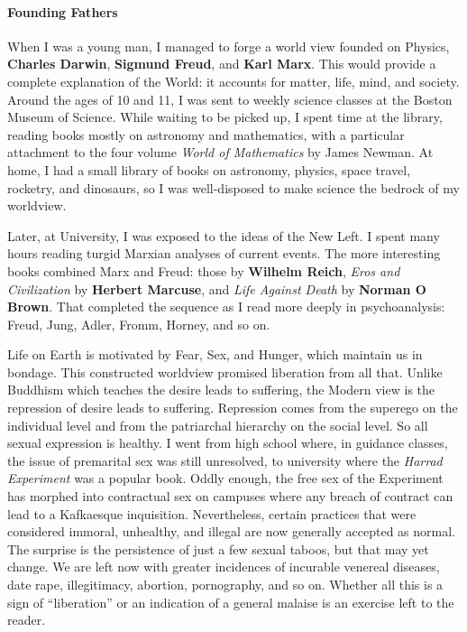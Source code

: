 \paragraph{Founding Fathers}


When I was a young man, I managed to forge a world view founded on Physics, \textbf{Charles Darwin}, \textbf{Sigmund Freud}, and \textbf{Karl Marx}. This would provide a complete explanation of the World: it accounts for matter, life, mind, and society. Around the ages of 10 and 11, I was sent to weekly science classes at the Boston Museum of Science. While waiting to be picked up, I spent time at the library, reading books mostly on astronomy and mathematics, with a particular attachment to the four volume \emph{World of Mathematics} by James Newman. At home, I had a small library of books on astronomy, physics, space travel, rocketry, and dinosaurs, so I was well-disposed to make science the bedrock of my worldview.

Later, at University, I was exposed to the ideas of the New Left. I spent many hours reading turgid Marxian analyses of current events. The more interesting books combined Marx and Freud: those by \textbf{Wilhelm Reich}, \emph{Eros and Civilization} by \textbf{Herbert Marcuse}, and \emph{Life Against Death} by \textbf{Norman O Brown}. That completed the sequence as I read more deeply in psychoanalysis: Freud, Jung, Adler, Fromm, Horney, and so on.

Life on Earth is motivated by Fear, Sex, and Hunger, which maintain us in bondage. This constructed worldview promised liberation from all that. Unlike Buddhism which teaches the desire leads to suffering, the Modern view is the repression of desire leads to suffering. Repression comes from the superego on the individual level and from the patriarchal hierarchy on the social level. So all sexual expression is healthy. I went from high school where, in guidance classes, the issue of premarital sex was still unresolved, to university where the \emph{Harrad Experiment} was a popular book. Oddly enough, the free sex of the Experiment has morphed into contractual sex on campuses where any breach of contract can lead to a Kafkaesque inquisition. Nevertheless, certain practices that were considered immoral, unhealthy, and illegal are now generally accepted as normal. The surprise is the persistence of just a few sexual taboos, but that may yet change. We are left now with greater incidences of incurable venereal diseases, date rape, illegitimacy, abortion, pornography, and so on. Whether all this is a sign of ``liberation'' or an indication of a general malaise is an exercise left to the reader.

